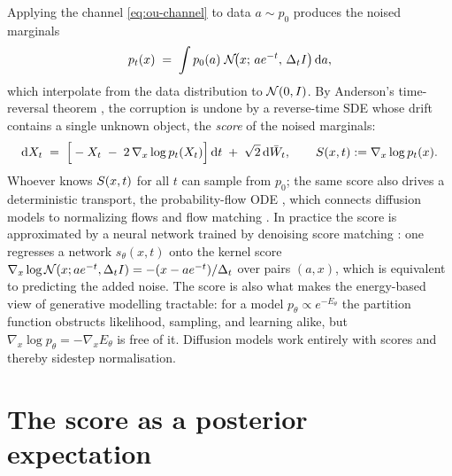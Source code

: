 Applying the channel \eqref{eq:ou-channel} to data $a \sim p_0$ produces
the noised marginals
\begin{equation}
  p_t(x) \;=\; \int p_0(a)\; \mathcal{N}\!\big(x;\, a e^{-t},\, \Delta_t I\big)\,
  \mathrm{d} a ,
  \label{eq:pt-convolution}
\end{equation}
which interpolate from the data distribution to $\mathcal{N}(0, I)$. By Anderson's
time-reversal theorem \citep{anderson1982reverse}, the corruption is undone
by a reverse-time SDE whose drift contains a single unknown object, the
\emph{score} of the noised marginals:
\begin{equation}
  \mathrm{d} X_t \;=\;
  \Big[ -X_t \;-\; 2\, \nabla_x \log p_t(X_t) \Big]\,\mathrm{d} t
  \;+\; \sqrt{2}\, \mathrm{d} \bar W_t ,
  \qquad
  S(x,t) := \nabla_x \log p_t(x) .
  \label{eq:reverse-sde}
\end{equation}
Whoever knows $S(x,t)$ for all $t$ can sample from $p_0$; the same
score also drives a deterministic transport, the probability-flow ODE
\citep{song2021scorebased}, which connects diffusion models to normalizing
flows and flow matching \citep{chen2018neural, lipman2023flow,
albergo2023building}. In practice the score is approximated by a neural
network trained by denoising score matching
\citep{hyvarinen2005estimation, vincent2011connection, ho2020denoising}:
one regresses a network $s_\theta(x, t)$ onto the kernel score
$\nabla_x \log \mathcal{N}(x; a e^{-t}, \Delta_t I) = -(x - a e^{-t})/\Delta_t$ over
pairs $(a, x)$, which is equivalent to predicting the added noise. The
score is also what makes the energy-based view of generative modelling
\citep{lecun2006tutorial} tractable: for a model
$p_\theta \propto e^{-E_\theta}$ the partition function obstructs
likelihood, sampling, and learning alike, but
$\nabla_x \log p_\theta = -\nabla_x E_\theta$ is free of it. Diffusion
models work entirely with scores and thereby sidestep normalisation.

\section{The score as a posterior expectation}\label{sec:tweedie}

